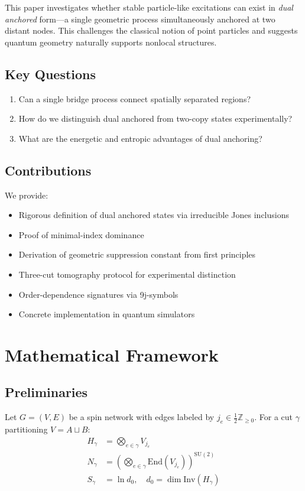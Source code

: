 \documentclass[11pt]{article}
\newcommand{\Inv}{\mathrm{Inv}}
\theoremstyle{plain}
\theoremstyle{definition}
\begin{document}
This paper investigates whether stable particle-like excitations can exist in \emph{dual anchored} form—a single geometric process simultaneously anchored at two distant nodes. This challenges the classical notion of point particles and suggests quantum geometry naturally supports nonlocal structures.

\subsection{Key Questions}
\begin{enumerate}
  \item Can a single bridge process connect spatially separated regions?
  \item How do we distinguish dual anchored from two-copy states experimentally?
  \item What are the energetic and entropic advantages of dual anchoring?
\end{enumerate}

\subsection{Contributions}
We provide:
\begin{itemize}
  \item Rigorous definition of dual anchored states via irreducible Jones inclusions
  \item Proof of minimal-index dominance
  \item Derivation of geometric suppression constant from first principles
  \item Three-cut tomography protocol for experimental distinction
  \item Order-dependence signatures via 9j-symbols
  \item Concrete implementation in quantum simulators
\end{itemize}

\section{Mathematical Framework}
\label{sec:framework}

\subsection{Preliminaries}
Let $G = (V,E)$ be a spin network with edges labeled by $j_e \in \frac{1}{2}\mathbb{Z}_{\geq 0}$. For a cut $\gamma$ partitioning $V = A \sqcup B$:
\begin{align}
  H_\gamma &= \bigotimes_{e \in \gamma} V_{j_e} \\
  N_\gamma &= \left(\bigotimes_{e \in \gamma} \mathrm{End}(V_{j_e})\right)^{\mathrm{SU}(2)} \\
  S_\gamma &= \ln d_0, \quad d_0 = \dim\Inv(H_\gamma)
\end{align}
\end{document}
